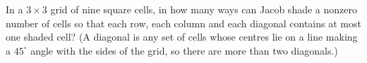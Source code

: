 In a $3\times3$ grid of nine square cells, in how many ways can Jacob shade a nonzero number of cells so that each row, each column and each diagonal contains at most one shaded cell? (A diagonal is any set of cells whose centres lie on a line making a $45^\circ$ angle with the sides of the grid, so there are more than two diagonals.)
